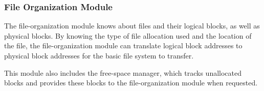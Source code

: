 \subsubsection{File Organization Module}\label{subsubsec:File_Organization_FS_Module}
The file-organization module knows about files and their logical blocks, as well as physical blocks.
By knowing the type of file allocation used and the location of the file, the file-organization module can translate logical block addresses to physical block addresses for the basic file system to transfer.

This module also includes the free-space manager, which tracks unallocated blocks and provides these blocks to the file-organization module when requested.



